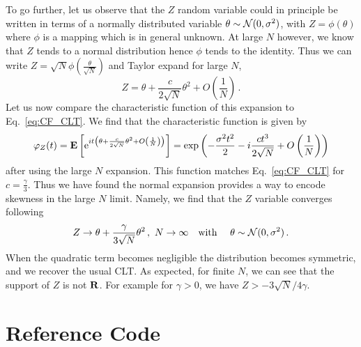 \documentclass[11pt]{article}
\newcommand{\be}{\begin{equation}}
\newcommand{\ee}{\end{equation}}
\begin{document}
To go further, let us observe that the $Z$ random variable could in principle be written in terms of a normally distributed variable $\theta\sim {\cal N}(0,\sigma^2)$,
 with $Z=\phi(\theta)$ where $\phi$ is a mapping which is in general unknown.  At large $N$ however, we know that $Z$ tends to a normal distribution hence $\phi$ tends to the identity. Thus we can write $Z=\sqrt{N}\phi\left(\frac{\theta}{\sqrt{N}}\right)$ and Taylor expand for large $N$,
\be
Z=\theta+\frac{c}{2\sqrt{N}}\theta^2+O\left(\frac{1}{N}\right)\,.
\ee
Let us now compare the characteristic function of  this expansion to Eq.~\eqref{eq:CF_CLT}.
We find that the characteristic function is given by
\be
\varphi_Z(t)={\bf E} \left[ \mathrm{e}^{it \left(\theta+\frac{c}{2\sqrt{N}}\theta^2+O\left(\frac{1}{N}\right)\right)} \right]
=\exp\left(-\frac{\sigma^2 t^2}{2}-i \frac{c t^3}{ 2 \sqrt{N}} +O\left(\frac{1}{N}\right)\right)
\label{eq:CF_exp}
\ee
after using the large $N$ expansion. This function matches Eq.~\eqref{eq:CF_CLT} for $c=\frac{\gamma}{3}$. Thus we have found the normal expansion provides a way to encode skewness in the large $N$ limit. Namely, we find that the $Z$ variable converges following
\be
Z\rightarrow \theta+\frac{\gamma}{3\sqrt{N}}\theta^2\,,\,\,N\rightarrow \infty  \quad \textrm{with } \quad \theta\sim{\cal N}(0,\sigma^2)\,.
\ee
When the quadratic term becomes negligible the distribution becomes symmetric, and we recover the usual CLT.
As expected, for finite $N$, we can see that  the support of $Z$ is not $\bf R$. For example for $\gamma>0$, we have
$Z > -3\sqrt{N}/4\gamma$.

\section{Reference Code}
\label{sec:reference_code}
\end{document}
